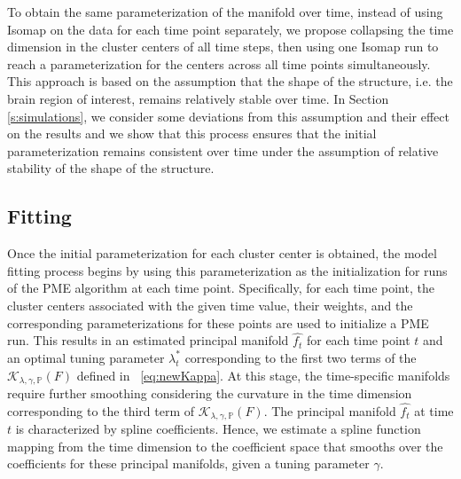 \documentclass[11pt,reqno]{article}
\theoremstyle{definition}
\begin{document}
To obtain the same parameterization of the manifold over time, instead of using Isomap on the data for each time point separately, we propose collapsing the time dimension in the cluster centers of all time steps, then using one Isomap run to reach a parameterization for the centers across all time points simultaneously. This approach is based on the assumption that the shape of the structure, i.e. the brain region of interest, remains relatively stable over time. In Section \ref{s:simulations}, we consider some deviations from this assumption and their effect on the results and we show that this process ensures that the initial parameterization remains consistent over time under the assumption of relative stability of the shape of the structure. 

\subsection*{Fitting}

Once the initial parameterization for each cluster center is obtained, the model fitting process begins by using this parameterization as the initialization for runs of the PME algorithm at each time point. Specifically, for each time point, the cluster centers associated with the given time value, their weights, and the corresponding parameterizations for these points are used to initialize a PME run. This results in an estimated principal manifold $\widehat{f_t}$ for each time point $t$ and an optimal tuning parameter $\lambda_t^*$ corresponding to the first two terms of the $\mathcal{K}_{\lambda, \gamma, \mathbb{P}}(F)$ defined in ~\eqref{eq:newKappa}. At this stage, the time-specific manifolds require further smoothing considering the curvature in the time dimension corresponding to the third term of $\mathcal{K}_{\lambda, \gamma, \mathbb{P}}(F)$. The principal manifold $\widehat{f_t}$ at time $t$ is characterized by spline coefficients. Hence, we estimate a spline function mapping from the time dimension to the coefficient space that smooths over the coefficients for these principal manifolds, given a tuning parameter $\gamma$.
\end{document}
